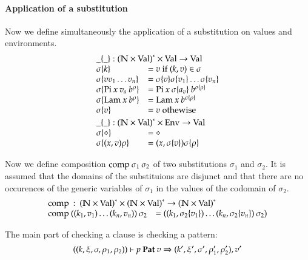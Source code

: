 \paragraph*{Application of a substitution}
Now we define simultaneously the application of a substitution on values and environments.
\[
\begin{array}{ll}
\multicolumn{2}{l}{\subst{\_}{\_} : \ves{(\cN \times \Val)} \times \Val \ra \Val} \\
\subst{\sigma}{k} & = v \mbox{ if } (k,v) \in \sigma \\
\subst{\sigma}{v v_1 \ldots v_n} & = \subst{\sigma}{v} \subst{\sigma}{v_1} \ldots \subst{\sigma}{v_n}\\
\subst{\sigma}{\vpi \: x \: v_a \: \cl{b}{\rho}} & = \vpi \: x \: \subst{\sigma}{a_v} \: \cl{b}{\subst{\sigma}{\rho}} \\
\subst{\sigma}{\vlam \: x \: \cl{b}{\rho}} & = \vlam \: x \: \cl{b}{\subst{\sigma}{\rho}} \\
\subst{\sigma}{v} & = v \mbox{ othewise }
\vs\\
\multicolumn{2}{l}{\substEnv{\_}{\_} : \ves{(\cN \times \Val)} \times \Env \ra \Val} \\
\substEnv{\sigma}{\diamond} & = \diamond \\
\substEnv{\sigma}{(x,v)\rho} & = (x,\subst{\sigma}{v}) \substEnv{\sigma}{\rho} \\
\end{array}
\]

Now we define composition $\mathrm{comp}\:\sigma_1\:\sigma_2$ of two substitutions $\sigma_1$ and $\sigma_2$.
It is assumed that the domains of the substituions are disjunct and that there are no occurences of the generic variables of $\sigma_1$ in the values of the codomain of $\sigma_2$.  
\[
\begin{array}{ll}
\multicolumn{2}{l}{\compS : \ves{(\cN \times \Val)} \times \ves{(\cN \times \Val)} \ra \ves{(\cN \times \Val)}} \\
\compS{((k_1,v_1)\ldots(k_n,v_n))}{\sigma_2} & = ((k_1,\subst{\sigma_2}{v_1})\ldots(k_n,\subst{\sigma_2}{v_n})\: \sigma_2) 
\end{array}
\]

The main part of checking a clause is checking a pattern:
\[
((k,\xi,\sigma,\rho_1,\rho_2))\vdash p\:\mathbf{Pat}\:v\Rightarrow (k',\xi',\sigma',\rho'_1,\rho'_2),v'
\]

